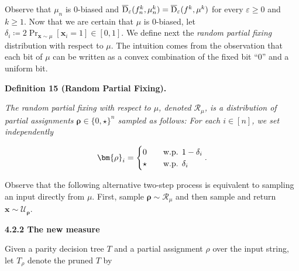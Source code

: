 Observe that $\mu_{n}$ is $0$-biased and $\overline{{\textup{D}}}_{\varepsilon}(f_{n}^{k},\mu_{n}^{k})=\overline{{\textup{D}}}_{\varepsilon}(f^{k},\mu^{k})$ for every $\varepsilon\geq 0$ and $k\geq 1$. Now that we are certain that $\mu$ is $0$-biased, let $\delta_{i}\coloneqq 2\Pr_{\bm{x}\sim\mu}[\bm{x}_{i}=1]\in[0,1]$. We define next the \emph{random partial fixing} distribution with respect to $\mu$. The intuition comes from the observation that each bit of $\mu$ can be written as a convex combination of the fixed bit “$0$” and a uniform bit.\par





\par\medskip\noindent\textbf{
\textbf{Definition 15}\textbf{ }(Random Partial Fixing)\textbf{.}
}\par



\emph{The random partial fixing with respect to $\mu$, denoted $\mathcal{R}_{\mu}$, is a distribution of partial assignments $\bm{\rho}\in\{0,\star\}^{n}$ sampled as follows: For each $i\in[n]$, we set independently}\par


\[\begin{gathered}
\bm{\rho}_{i}=\begin{cases}0&\quad\textup{w.p. $1-\delta_{i}$}\\
\star&\quad\textup{w.p. $\delta_{i}$}\end{cases}.
\end{gathered}\]






Observe that the following alternative two-step process is equivalent to sampling an input directly from $\mu$. First, sample $\bm{\rho}\sim\mathcal{R}_{\mu}$ and then sample and return $\bm{x}\sim\mathcal{U}_{\bm{\rho}}$.\par





\par\medskip\noindent\textbf{
4.2.2 The new measure}\par




Given a parity decision tree $T$ and a partial assignment $\rho$ over the input string, let $T_{\rho}$ denote the pruned $T$ by\par


